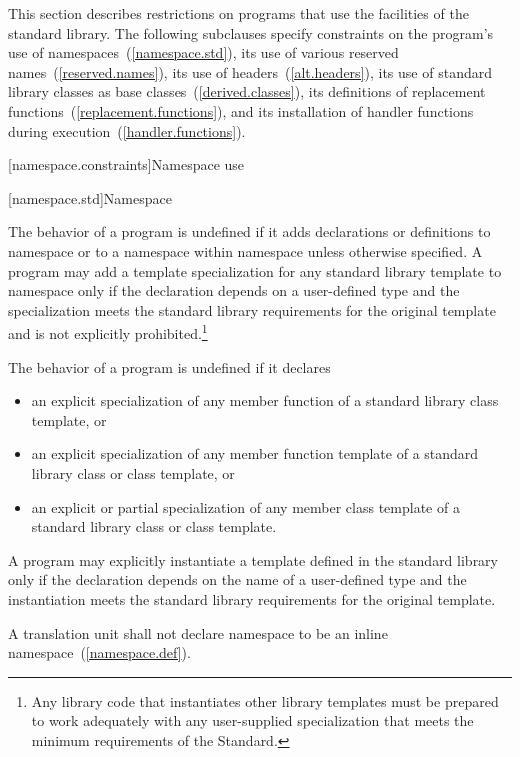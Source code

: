 \pnum
This section describes restrictions on \Cpp programs that use the facilities of
the \Cpp standard library. The following subclauses specify constraints on the
program's use of namespaces~(\ref{namespace.std}), its use of various reserved
names~(\ref{reserved.names}), its use of headers~(\ref{alt.headers}), its use of
standard library classes as base classes~(\ref{derived.classes}), its
definitions of replacement functions~(\ref{replacement.functions}), and its
installation of handler functions during execution~(\ref{handler.functions}).

[namespace.constraints]{Namespace use}

[namespace.std]{Namespace }

\pnum
The behavior of a \Cpp program is undefined if it adds declarations or definitions to namespace
or to a namespace within namespace
unless otherwise specified.
A program may add a template specialization for any standard library template
to namespace
 only if the declaration
depends on a user-defined type
and the specialization meets the standard library requirements
for the original template and is not explicitly prohibited.\footnote{Any
library code that instantiates other library templates
must be prepared to work adequately with any user-supplied specialization
that meets the minimum requirements of the Standard.}

\pnum
The behavior of a \Cpp program is undefined if it declares
\begin{itemize}
\item an explicit specialization of any member function of a standard
library class template, or

\item an explicit specialization of any member function template of a
standard library class or class template, or

\item an explicit or partial specialization of any member class template
of a standard library class or class template.
\end{itemize}
A program may explicitly instantiate a template defined in the standard library
only if the declaration depends on the name of a user-defined type
and the instantiation meets the standard library requirements for the
original template.

\pnum
A translation unit shall not declare namespace  to be an inline namespace~(\ref{namespace.def}).

